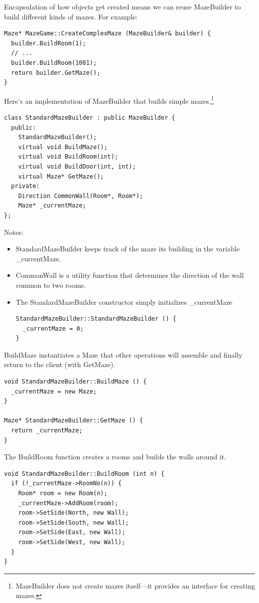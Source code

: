 \documentclass[11pt]{report}
\begin{document}
Encapsulation of how objects get created means we can reuse MazeBuilder to build
different kinds of mazes. For example:
\begin{lstlisting}
Maze* MazeGame::CreateComplexMaze (MazeBuilder& builder) {
  builder.BuildRoom(1);
  // ...
  builder.BuildRoom(1001);
  return builder.GetMaze();
}
\end{lstlisting}

Here's an implementation of MazeBuilder that builds simple mazes.\footnote{MazeBuilder does
not create mazes itself---it provides an interface for creating mazes.}
\begin{lstlisting}
class StandardMazeBuilder : public MazeBuilder {
  public:
    StandardMazeBuilder();
    virtual void BuildMaze();
    virtual void BuildRoom(int);
    virtual void BuildDoor(int, int);
    virtual Maze* GetMaze();
  private:
    Direction CommonWall(Room*, Room*);
    Maze* _currentMaze;
};
\end{lstlisting}
Notes:
\begin{itemize}
\item StandardMazeBuilder keeps track of the maze its building in the variable \_currentMaze. 
\item CommonWall is a utility function that determines the direction of the wall common to two rooms.
\item The StandardMazeBuilder constructor simply initializes \_currentMaze
\begin{lstlisting}
StandardMazeBuilder::StandardMazeBuilder () {
  _currentMaze = 0;
}
\end{lstlisting}
\end{itemize}

BuildMaze instantiates a Maze that other operations will assemble and finally return 
to the client (with GetMaze).
\begin{lstlisting}
void StandardMazeBuilder::BuildMaze () {
  _currentMaze = new Maze;
}

Maze* StandardMazeBuilder::GetMaze () {
  return _currentMaze;
}
\end{lstlisting}

The BuildRoom function creates a rooms and builds the walls around it.
\begin{lstlisting}
void StandardMazeBuilder::BuildRoom (int n) {
  if (!_currentMaze->RoomNo(n)) {
    Room* room = new Room(n);
    _currentMaze->AddRoom(room);
    room->SetSide(North, new Wall);
    room->SetSide(South, new Wall);
    room->SetSide(East, new Wall);
    room->SetSide(West, new Wall);
  } 
}
\end{lstlisting}
\end{document}
